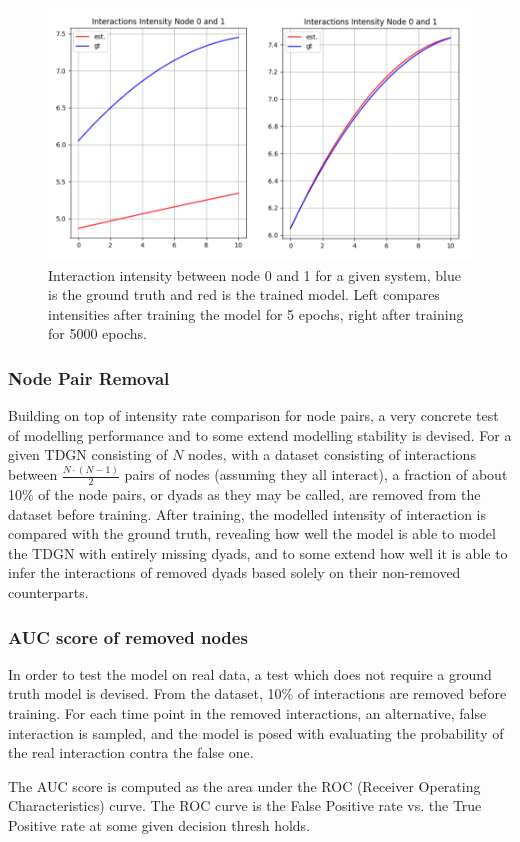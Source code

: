 \begin{figure}[H]
    \centering
    \includegraphics[width=\textwidth]{0_images/5vs5000epochs.png}
    \caption{Interaction intensity between node 0 and 1 for a given system, blue is the ground truth and red is the trained model. Left compares intensities after training the model for 5 epochs, right after training for 5000 epochs.}
    \label{fig:5vs5000epochs}
\end{figure}


\subsubsection{Node Pair Removal}
\label{sec:Method:Evaluation:NodePairRemoval}
Building on top of intensity rate comparison for node pairs, a very concrete test of modelling performance and to some extend modelling stability is devised.
For a given TDGN consisting of $N$ nodes, with a dataset consisting of interactions between $\frac{N\cdot(N-1)}{2}$ pairs of nodes (assuming they all interact), a fraction of about 10\% of the node pairs, or dyads as they may be called, are removed from the dataset before training.
After training, the modelled intensity of interaction is compared with the ground truth, revealing how well the model is able to model the TDGN with entirely missing dyads, and to some extend how well it is able to infer the interactions of removed dyads based solely on their non-removed counterparts.


\subsubsection{AUC score of removed nodes}
\label{sec:Method:Evaluation:AUC}
In order to test the model on real data, a test which does not require a ground truth model is devised.
From the dataset, 10\% of interactions are removed before training.
For each time point in the removed interactions, an alternative, false interaction is sampled, and the model is posed with evaluating the probability of the real interaction contra the false one.

The AUC score is computed as the area under the ROC (Receiver Operating Characteristics) curve.
The ROC curve is the False Positive rate vs. the True Positive rate at some given decision thresh holds.



